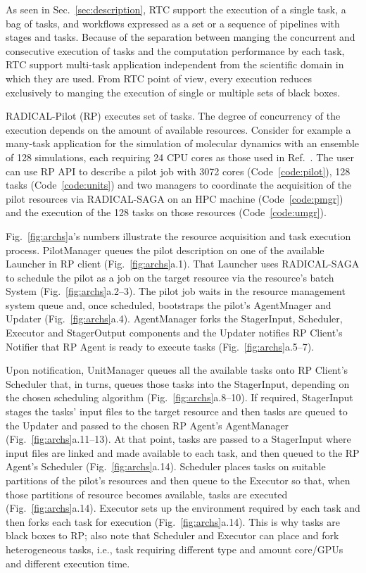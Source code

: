 \documentclass[preprint,12pt, a4paper]{elsarticle}
\begin{document}
As seen in Sec.~\ref{sec:description}, RTC support the execution of a single
task, a bag of tasks, and workflows expressed as a set or a sequence of
pipelines with stages and tasks. Because of the separation between manging
the concurrent and consecutive execution of tasks and the computation
performance by each task, RTC support multi-task application independent
from the scientific domain in which they are used. From RTC point of view,
every execution reduces exclusively to manging the execution of single or
multiple sets of black boxes.

RADICAL-Pilot (RP) executes set of tasks. The degree of concurrency of the
execution depends on the amount of available resources. Consider for example
a many-task application for the simulation of molecular dynamics with an
ensemble of 128 simulations, each requiring 24 CPU cores as those used in
Ref.~\cite{balasubramanian2016extasy}. The user can use RP API to describe a
pilot job with 3072 cores (Code~\ref{code:pilot}), 128 tasks
(Code~\ref{code:units}) and two managers to coordinate the acquisition of the
pilot resources via RADICAL-SAGA on an HPC machine (Code~\ref{code:pmgr}) and
the execution of the 128 tasks on those resources (Code~\ref{code:umgr}).

Fig.~\ref{fig:archs}a's numbers illustrate the resource acquisition and
task execution process. PilotManager queues the pilot description on one of
the available Launcher in RP client (Fig.~\ref{fig:archs}a.1). That Launcher
uses RADICAL-SAGA to schedule the pilot as a job on the target resource via
the resource's batch System (Fig.~\ref{fig:archs}a.2--3). The pilot job waits
in the resource management system queue and, once scheduled, bootstraps the
pilot's AgentMnager and Updater (Fig.~\ref{fig:archs}a.4). AgentManager forks
the StagerInput, Scheduler, Executor and StagerOutput components and the
Updater notifies RP Client's Notifier that RP Agent is ready to execute tasks
(Fig.~\ref{fig:archs}a.5--7).

Upon notification, UnitManager queues all the available tasks onto RP
Client's Scheduler that, in turns, queues those tasks into the StagerInput,
depending on the chosen scheduling algorithm (Fig.~\ref{fig:archs}a.8--10).
If required, StagerInput stages the tasks' input files to the target resource
and then tasks are queued to the Updater and passed to the chosen RP Agent's
AgentManager (Fig.~\ref{fig:archs}a.11--13). At that point, tasks are passed
to a StagerInput where input files are linked and made available to each
task, and then queued to the RP Agent's Scheduler (Fig.~\ref{fig:archs}a.14).
Scheduler places tasks on suitable partitions of the pilot's resources and
then queue to the Executor so that, when those partitions of resource becomes
available, tasks are executed (Fig.~\ref{fig:archs}a.14). Executor sets up
the environment required by each task and then forks each task for execution
(Fig.~\ref{fig:archs}a.14). This is why tasks are black boxes to RP\@; also
note that Scheduler and Executor can place and fork heterogeneous tasks,
i.e., task requiring different type and amount core/GPUs and different
execution time.
\end{document}
